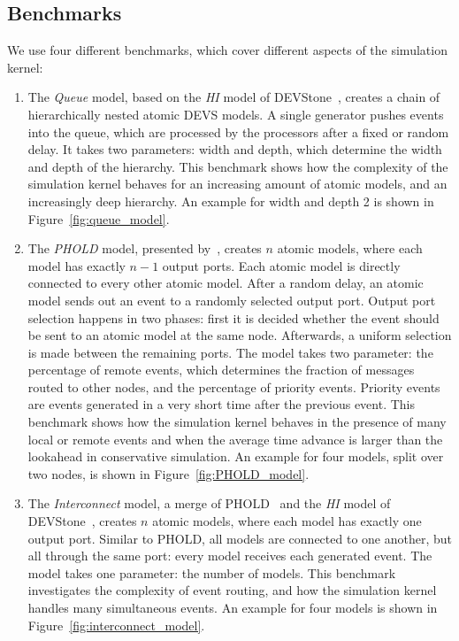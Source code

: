 \subsection{Benchmarks}
We use four different benchmarks, which cover different aspects of the simulation kernel:
\begin{enumerate}
	\item The \textit{Queue} model, based on the \textit{HI} model of DEVStone~\cite{DEVStone}, creates a chain of hierarchically nested atomic \textsf{DEVS} models.
	A single generator pushes events into the queue, which are processed by the processors after a fixed or random delay.
	It takes two parameters: width and depth, which determine the width and depth of the hierarchy.
	This benchmark shows how the complexity of the simulation kernel behaves for an increasing amount of atomic models, and an increasingly deep hierarchy.
	An example for width and depth 2 is shown in Figure~\ref{fig:queue_model}.
	
	\item The \textit{PHOLD} model, presented by~\cite{PHOLD}, creates $n$ atomic models, where each model has exactly $n-1$ output ports.
	Each atomic model is directly connected to every other atomic model.
	After a random delay, an atomic model sends out an event to a randomly selected output port.
	Output port selection happens in two phases: first it is decided whether the event should be sent to an atomic model at the same node.
	Afterwards, a uniform selection is made between the remaining ports.
	The model takes two parameter: the percentage of remote events, which determines the fraction of messages routed to other nodes, and the percentage of priority events. Priority events are events generated in a very short time after the previous event.
	This benchmark shows how the simulation kernel behaves in the presence of many local or remote events and when the average time advance is larger than the lookahead in conservative simulation.
	An example for four models, split over two nodes, is shown in Figure~\ref{fig:PHOLD_model}.
	
	\item The \textit{Interconnect} model, a merge of PHOLD~\cite{PHOLD} and the \textit{HI} model of DEVStone~\cite{DEVStone}, creates $n$ atomic models, where each model has exactly one output port.
	Similar to PHOLD, all models are connected to one another, but all through the same port: every model receives each generated event.
	The model takes one parameter: the number of models.
	This benchmark investigates the complexity of event routing, and how the simulation kernel handles many simultaneous events.
	An example for four models is shown in Figure~\ref{fig:interconnect_model}.
	

\end{enumerate}
